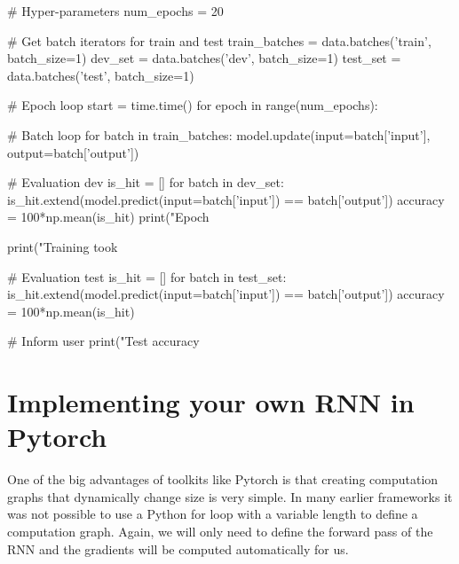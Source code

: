 \begin{exercise}
\begin{python}
# Hyper-parameters
num_epochs = 20

# Get batch iterators for train and test
train_batches = data.batches('train', batch_size=1)
dev_set = data.batches('dev', batch_size=1)
test_set = data.batches('test', batch_size=1)

# Epoch loop
start = time.time()
for epoch in range(num_epochs):

    # Batch loop
    for batch in train_batches:
        model.update(input=batch['input'], output=batch['output'])

    # Evaluation dev
    is_hit = []
    for batch in dev_set:
        is_hit.extend(model.predict(input=batch['input']) == batch['output'])
    accuracy = 100*np.mean(is_hit)
    print("Epoch %

print("Training took %

# Evaluation test
is_hit = []
for batch in test_set:
    is_hit.extend(model.predict(input=batch['input']) == batch['output'])
accuracy = 100*np.mean(is_hit)

# Inform user
print("Test accuracy %
\end{python}
\end{exercise}

\clearpage
\section{Implementing your own RNN in Pytorch}

One of the big advantages of toolkits like Pytorch is that creating computation graphs that dynamically change size is very simple. In many earlier frameworks it was not possible to use a Python for loop with a variable length to define a computation graph. Again, we will only need to define the forward pass of the RNN and the gradients will be computed automatically for us.


